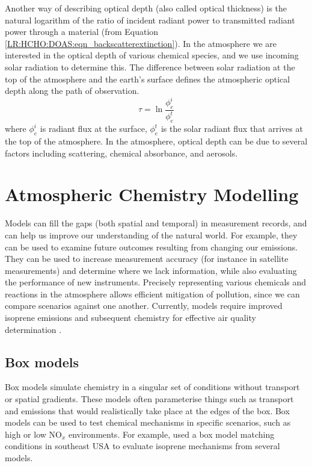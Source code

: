       Another way of describing optical depth (also called optical thickness) is the natural logarithm of the ratio of incident radiant power to transmitted radiant power through a material (from Equation \ref{LR:HCHO:DOAS:eqn_backscatterextinction}).
      In the atmosphere we are interested in the optical depth of various chemical species, and we use incoming solar radiation to determine this.
      The difference between solar radiation at the top of the atmosphere and the earth's surface defines the atmospheric optical depth along the path of observation.
      \begin{equation}
      \tau = \ln{\frac{\phi_e^i}{\phi_e^t}}
      \end{equation}
      where $\phi_e^i$ is radiant flux at the surface, $\phi_e^t$ is the solar radiant flux that arrives at the top of the atmosphere.
      In the atmosphere, optical depth can be due to several factors including scattering, chemical absorbance, and aerosols.
  
\section{Atmospheric Chemistry Modelling}
\label{LR:Models}
  
  Models can fill the gaps (both spatial and temporal) in measurement records, and can help us improve our understanding of the natural world.
  For example, they can be used to examine future outcomes resulting from changing our emissions.
  They can be used to increase measurement accuracy (for instance in satellite measurements) and determine where we lack information, while also evaluating the performance of new instruments.
  Precisely representing various chemicals and reactions in the atmosphere allows efficient mitigation of pollution, since we can compare scenarios against one another.
  Currently, models require improved isoprene emissions and subsequent chemistry for effective air quality determination \parencite{Marvin2017}.
  
  
  \subsection{Box models}
    
    Box models simulate chemistry in a singular set of conditions without transport or spatial gradients.
    These models often parameterise things such as transport and emissions that would realistically take place at the edges of the box.
    Box models can be used to test chemical mechanisms in specific scenarios, such as high or low NO$_x$ environments.
    For example, \textcite{Marvin2017} used a box model matching conditions in southeast USA to evaluate isoprene mechanisms from several models.  
    
